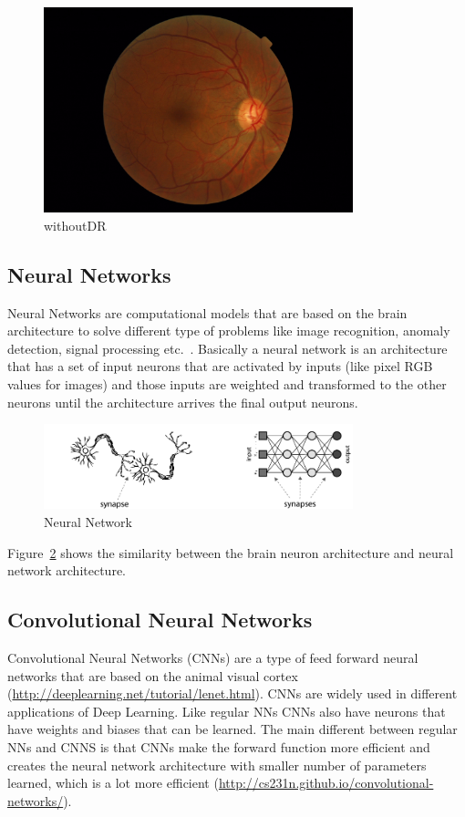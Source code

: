 \begin{figure}[t]
\centering
\includegraphics[width=0.8\textwidth]{Figures/NODR}
\caption{withoutDR}
\label{fignoDR}
\end{figure}

\subsection{Neural Networks}
Neural Networks are computational models that are based on the brain architecture to solve different type of problems like image recognition, anomaly detection, signal processing etc.\ \citep{shiffman2012nature}. Basically a neural network is an architecture that has a set of input neurons that are activated by inputs (like pixel RGB values for images) and those inputs are weighted and transformed to the other neurons until the architecture arrives the final output neurons. 

\begin{figure}[t]
\centering
\includegraphics[width=0.8\textwidth]{Figures/nn}
\caption{Neural Network}
\label{fignn}
\end{figure}

Figure~\ref{fignn} shows the similarity between the brain neuron architecture and neural network architecture. 

\subsection{Convolutional Neural Networks}
Convolutional Neural Networks (CNNs) are a type of feed forward neural networks that are based on the animal visual cortex (\url{http://deeplearning.net/tutorial/lenet.html}). CNNs are widely used in different applications of Deep Learning. 
Like regular NNs CNNs also have neurons that have weights and biases that can be learned. The main different between regular NNs and CNNS is that CNNs make the forward function more efficient and creates the neural network architecture with smaller number of parameters learned, which is a lot more efficient (\url{http://cs231n.github.io/convolutional-networks/}).

